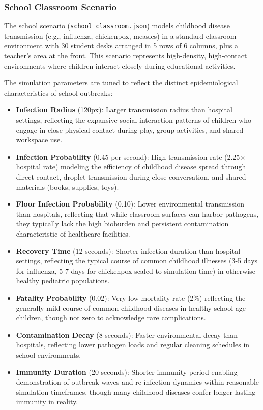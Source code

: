 \subsubsection{School Classroom Scenario}
\label{sec:school-scenario}

The school scenario (\texttt{school\_classroom.json}) models childhood disease transmission (e.g., influenza, chickenpox, measles) in a standard classroom environment with 30 student desks arranged in 5 rows of 6 columns, plus a teacher's area at the front. This scenario represents high-density, high-contact environments where children interact closely during educational activities.

The simulation parameters are tuned to reflect the distinct epidemiological characteristics of school outbreaks:

\begin{itemize}
    \item \textbf{Infection Radius} (120px): Larger transmission radius than hospital settings, reflecting the expansive social interaction patterns of children who engage in close physical contact during play, group activities, and shared workspace use.
    
    \item \textbf{Infection Probability} (0.45 per second): High transmission rate (2.25$\times$ hospital rate) modeling the efficiency of childhood disease spread through direct contact, droplet transmission during close conversation, and shared materials (books, supplies, toys).
    
    \item \textbf{Floor Infection Probability} (0.10): Lower environmental transmission than hospitals, reflecting that while classroom surfaces can harbor pathogens, they typically lack the high bioburden and persistent contamination characteristic of healthcare facilities.
    
    \item \textbf{Recovery Time} (12 seconds): Shorter infection duration than hospital settings, reflecting the typical course of common childhood illnesses (3-5 days for influenza, 5-7 days for chickenpox scaled to simulation time) in otherwise healthy pediatric populations.
    
    \item \textbf{Fatality Probability} (0.02): Very low mortality rate (2\%) reflecting the generally mild course of common childhood diseases in healthy school-age children, though not zero to acknowledge rare complications.
    
    \item \textbf{Contamination Decay} (8 seconds): Faster environmental decay than hospitals, reflecting lower pathogen loads and regular cleaning schedules in school environments.
    
    \item \textbf{Immunity Duration} (20 seconds): Shorter immunity period enabling demonstration of outbreak waves and re-infection dynamics within reasonable simulation timeframes, though many childhood diseases confer longer-lasting immunity in reality.
\end{itemize}

